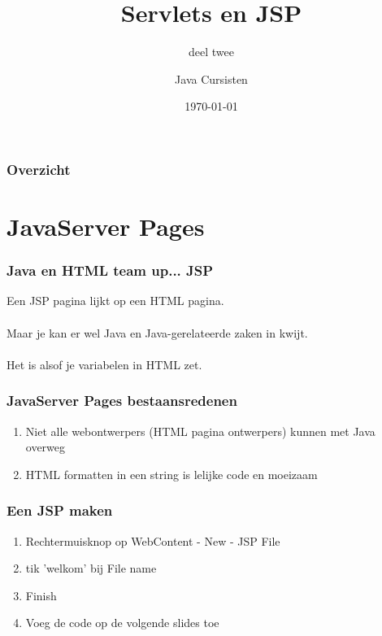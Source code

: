 \documentclass{beamer}
\title{Servlets en JSP}
\subtitle{deel twee}
\author{Java Cursisten}
\institute{INTEC Brussel}
\date{\today}
\begin{document}
\begin{frame}

\titlepage

\end{frame}


\begin{frame}

\frametitle{Overzicht}
{\Huge \tableofcontents}

\end{frame}



\section{JavaServer Pages}

\begin{frame}

\frametitle{Java en HTML team up... JSP}

{\Large Een JSP pagina lijkt op een HTML pagina.\\~\\

Maar je kan er wel Java en Java-gerelateerde 
zaken in kwijt.\\~\\

Het is alsof je variabelen in HTML zet.}


\end{frame}


\begin{frame}

\frametitle{JavaServer Pages bestaansredenen}

{\LARGE \begin{enumerate}
  \item Niet alle webontwerpers (HTML pagina ontwerpers) kunnen met Java overweg
  \item HTML formatten in een string is lelijke code en moeizaam
\end{enumerate}}

\end{frame}


\begin{frame}

\frametitle{Een JSP maken}

{\Large \begin{enumerate}
  \item Rechtermuisknop op WebContent - New - JSP File
  \item tik 'welkom' bij File name 
  \item Finish
  \item Voeg de code op de volgende slides toe
\end{enumerate}}

\end{frame}
\end{document}
